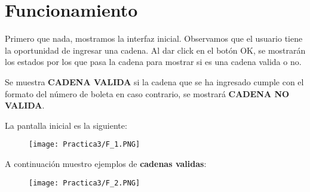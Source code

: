 \documentclass[12pt]{article}
\begin{document}

	\section{Funcionamiento}
	Primero que nada, mostramos la interfaz inicial. Observamos que el 
	usuario tiene la oportunidad de ingresar una cadena. Al dar click en el botón OK, se mostrarán los
	estados por los que pasa la cadena para mostrar si es una cadena valida o no.

	Se muestra \textbf{CADENA VALIDA} si la cadena que se ha ingresado cumple con el formato del número de boleta
	en caso contrario, se mostrará \textbf{CADENA NO VALIDA}.

	La pantalla inicial es la siguiente:
	
	\begin{figure}[H]
	        \centering
	        \texttt{[image: Practica3/F\_1.PNG]}
	\end{figure}
	\newpage
	A continuación muestro ejemplos de \textbf{cadenas validas}: 
	\begin{figure}[H]
	        \centering
	        \texttt{[image: Practica3/F\_2.PNG]}
	\end{figure}
	
\end{document}

